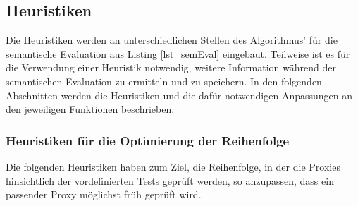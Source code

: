 \documentclass[a4paper,12pt]{article}
\begin{document}
\subsection{Heuristiken}
Die Heuristiken werden an unterschiedlichen Stellen des Algorithmus' für die semantische Evaluation aus Listing \ref{lst_semEval} eingebaut. Teilweise ist es für die Verwendung einer Heuristik notwendig, weitere Information während der semantischen Evaluation zu ermitteln und zu speichern. In den folgenden Abschnitten werden die Heuristiken und die dafür notwendigen Anpassungen an den jeweiligen Funktionen beschrieben.

\subsubsection{Heuristiken für die Optimierung der Reihenfolge}
Die folgenden Heuristiken haben zum Ziel, die Reihenfolge, in der die Proxies hinsichtlich der vordefinierten Tests geprüft werden, so anzupassen, dass ein passender Proxy möglichst früh geprüft wird.
\end{document}
